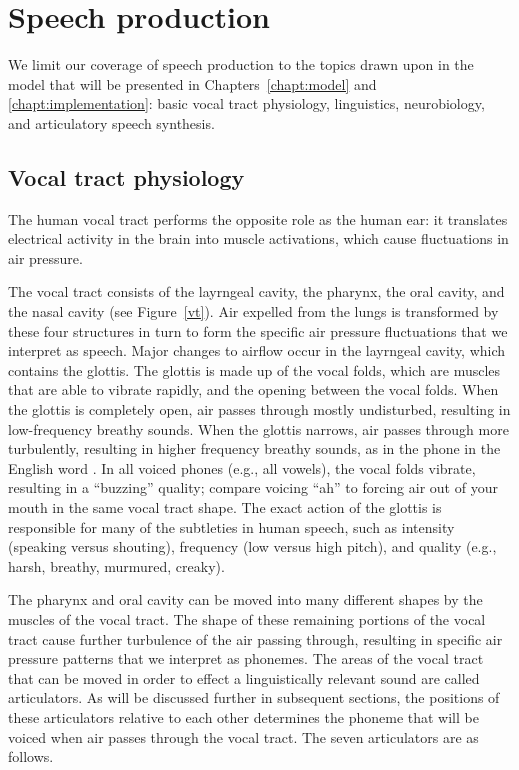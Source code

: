 \section{Speech production}

We limit our coverage
of speech production
to the topics drawn upon
in the model that will be presented
in Chapters~\ref{chapt:model}
and \ref{chapt:implementation}:
basic vocal tract physiology,
linguistics, neurobiology,
and articulatory speech synthesis.

\subsection{Vocal tract physiology}

The human vocal tract performs
the opposite role
as the human ear:
it translates electrical activity in the brain
into muscle activations,
which cause fluctuations in air pressure.


The vocal tract consists of
the layrngeal cavity,
the pharynx, the oral cavity,
and the nasal cavity
(see Figure~\ref{vt}).
Air expelled from the lungs
is transformed
by these four structures
in turn to form the
specific air pressure fluctuations
that we interpret as speech.
Major changes to airflow
occur in the layrngeal cavity,
which contains the glottis.
The glottis is made up of
the vocal folds,
which are muscles that are able to vibrate rapidly,
and the opening between the vocal folds.
When the glottis is completely open,
air passes through mostly undisturbed,
resulting in low-frequency breathy sounds.
When the glottis narrows,
air passes through more turbulently,
resulting in higher frequency breathy sounds,
as in the phone \ipa{[h]}
in the English word .
In all voiced phones (e.g., all vowels),
the vocal folds vibrate,
resulting in a ``buzzing'' quality;
compare voicing ``ah'' to
forcing air out of your mouth
in the same vocal tract shape.
The exact action of the glottis
is responsible for many
of the subtleties in human speech,
such as intensity (speaking versus shouting),
frequency (low versus high pitch),
and quality (e.g., harsh, breathy, murmured, creaky).

The pharynx and oral cavity
can be moved into many different shapes
by the muscles of the vocal tract.
The shape of these remaining portions
of the vocal tract cause further turbulence
of the air passing through,
resulting in specific air pressure patterns
that we interpret as phonemes.
The areas of the vocal tract
that can be moved in order to
effect a linguistically relevant sound
are called articulators.
As will be discussed further
in subsequent sections,
the positions of these articulators
relative to each other
determines the phoneme
that will be voiced
when air passes through
the vocal tract.
The seven articulators are
as follows.

